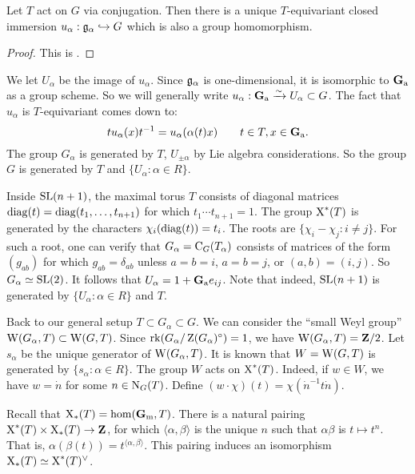 \begin{theorem}
Let $T$ act on $G$ via conjugation. Then there is a unique $T$-equivariant 
closed immersion $u_\alpha:\mathfrak{g}_\alpha\hookrightarrow G$ which is also a group 
homomorphism. 
\end{theorem}
\begin{proof}
This is \cite[XXII 1.1.i]{sga3-iii}. 
\end{proof}

We let $U_\alpha$ be the image of $u_\alpha$. Since $\mathfrak{g}_\alpha$ is 
one-dimensional, it is isomorphic to $\mathbf{G}_\mathrm{a}$ as a group scheme. So we will 
generally write $u_\alpha:\mathbf{G}_\mathrm{a}\xrightarrow\sim U_\alpha\subset G$. The fact that 
$u_\alpha$ is $T$-equivariant comes down to: 
\[
  t u_\alpha(x) t^{-1} = u_\alpha(\alpha(t) x) \qquad t\in T, x\in \mathbf{G}_\mathrm{a} .
\]
The group $G_\alpha$ is generated by $T$, $U_{\pm\alpha}$ by Lie 
algebra considerations. So the group $G$ is generated by $T$ and 
$\{U_\alpha:\alpha\in R\}$. 

\begin{example}
Inside $\operatorname{SL}(n+1)$, the maximal torus $T$ consists of diagonal matrices 
$\operatorname{diag}(t)=\operatorname{diag}(t_1,\dots,t_{n+1})$ for which 
$t_1\dotsm t_{n+1}=1$. The group $\operatorname{X}^\ast(T)$ is generated by the 
characters $\chi_i(\operatorname{diag}(t))=t_i$. The roots are 
$\{\chi_i-\chi_j:i\ne j\}$. For such a root, one can verify that 
$G_\alpha=\operatorname{C}_G(T_\alpha)$ consists of matrices of the 
form $(g_{a b})$ for which $g_{a b}=\delta_{a b}$ unless 
$a=b=i$, $a=b=j$, or $(a,b)=(i,j)$. So $G_\alpha\simeq \operatorname{SL}(2)$. 
It follows that $U_\alpha = 1+\mathbf{G}_\mathrm{a} e_{i j}$. Note that indeed, $\operatorname{SL}(n+1)$ is 
generated by $\{U_\alpha:\alpha\in R\}$ and $T$. 
\end{example}

Back to our general setup $T\subset G_\alpha\subset G$. We can consider the 
``small Weyl group'' $\operatorname{W}(G_\alpha,T)\subset \operatorname{W}(G,T)$. Since 
$\operatorname{rk}(G_\alpha/\operatorname{Z}(G_\alpha)^\circ)=1$, we have 
$\operatorname{W}(G_\alpha,T)=\mathbf{Z}/2$. Let $s_\alpha$ be the unique generator of 
$\operatorname{W}(G_\alpha,T)$. It is known that $W=\operatorname{W}(G,T)$ is generated by 
$\{s_\alpha:\alpha\in R\}$. The group $W$ acts on $\operatorname{X}^\ast(T)$. 
Indeed, if $w\in W$, we have $w=\dot n$ for some $n\in \operatorname{N}_G(T)$. 
Define $(w\cdot\chi)(t)=\chi(\dot n^{-1} t \dot n)$. 

Recall that $\operatorname{X}_\ast(T)=\hom(\mathbf{G}_\mathrm{m},T)$. There is a natural pairing 
$\operatorname{X}^\ast(T)\times \operatorname{X}_\ast(T)\to \mathbf{Z}$, for which 
$\langle \alpha,\beta\rangle$ is the unique $n$ such that $\alpha\beta$ is 
$t\mapsto t^n$. That is, $\alpha(\beta(t)) = t^{\langle\alpha,\beta\rangle}$. 
This pairing induces an isomorphism 
$\operatorname{X}_\ast(T)\simeq \operatorname{X}^\ast(T)^\vee$. 

